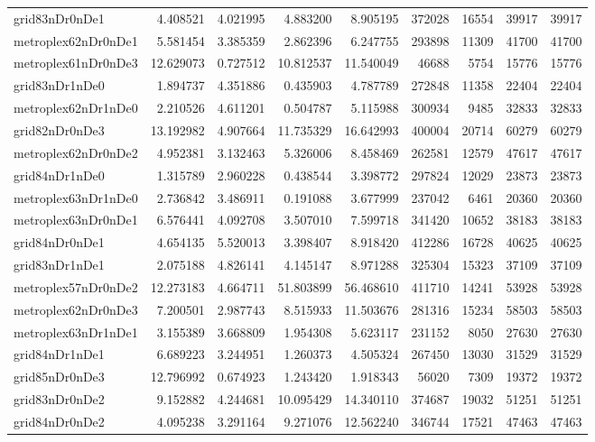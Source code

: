 \begin{longtable}{|l|r|r|r|r|r|r|r|r|}
grid83nDr0nDe1 & 4.408521 & 4.021995 & 4.883200 & 8.905195 & 372028 & 16554 & 39917 & 39917 \\
metroplex62nDr0nDe1 & 5.581454 & 3.385359 & 2.862396 & 6.247755 & 293898 & 11309 & 41700 & 41700 \\
metroplex61nDr0nDe3 & 12.629073 & 0.727512 & 10.812537 & 11.540049 & 46688 & 5754 & 15776 & 15776 \\
grid83nDr1nDe0 & 1.894737 & 4.351886 & 0.435903 & 4.787789 & 272848 & 11358 & 22404 & 22404 \\
metroplex62nDr1nDe0 & 2.210526 & 4.611201 & 0.504787 & 5.115988 & 300934 & 9485 & 32833 & 32833 \\
grid82nDr0nDe3 & 13.192982 & 4.907664 & 11.735329 & 16.642993 & 400004 & 20714 & 60279 & 60279 \\
metroplex62nDr0nDe2 & 4.952381 & 3.132463 & 5.326006 & 8.458469 & 262581 & 12579 & 47617 & 47617 \\
grid84nDr1nDe0 & 1.315789 & 2.960228 & 0.438544 & 3.398772 & 297824 & 12029 & 23873 & 23873 \\
metroplex63nDr1nDe0 & 2.736842 & 3.486911 & 0.191088 & 3.677999 & 237042 & 6461 & 20360 & 20360 \\
metroplex63nDr0nDe1 & 6.576441 & 4.092708 & 3.507010 & 7.599718 & 341420 & 10652 & 38183 & 38183 \\
grid84nDr0nDe1 & 4.654135 & 5.520013 & 3.398407 & 8.918420 & 412286 & 16728 & 40625 & 40625 \\
grid83nDr1nDe1 & 2.075188 & 4.826141 & 4.145147 & 8.971288 & 325304 & 15323 & 37109 & 37109 \\
metroplex57nDr0nDe2 & 12.273183 & 4.664711 & 51.803899 & 56.468610 & 411710 & 14241 & 53928 & 53928 \\
metroplex62nDr0nDe3 & 7.200501 & 2.987743 & 8.515933 & 11.503676 & 281316 & 15234 & 58503 & 58503 \\
metroplex63nDr1nDe1 & 3.155389 & 3.668809 & 1.954308 & 5.623117 & 231152 & 8050 & 27630 & 27630 \\
grid84nDr1nDe1 & 6.689223 & 3.244951 & 1.260373 & 4.505324 & 267450 & 13030 & 31529 & 31529 \\
grid85nDr0nDe3 & 12.796992 & 0.674923 & 1.243420 & 1.918343 & 56020 & 7309 & 19372 & 19372 \\
grid83nDr0nDe2 & 9.152882 & 4.244681 & 10.095429 & 14.340110 & 374687 & 19032 & 51251 & 51251 \\
grid84nDr0nDe2 & 4.095238 & 3.291164 & 9.271076 & 12.562240 & 346744 & 17521 & 47463 & 47463 \\

\end{longtable}
